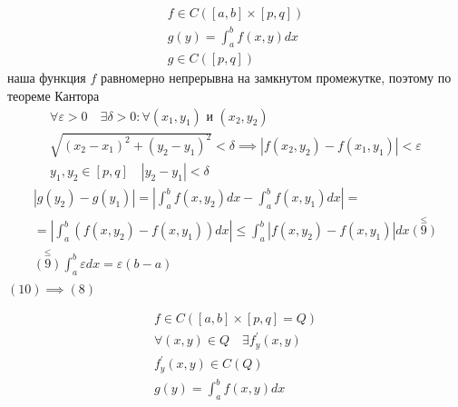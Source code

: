 \documentclass[main]{subfiles}
\begin{document}
     \begin{theorem}
          \begin{gather*}
               f \in C([a,b] \times [p,q]) \\ 
               g(y) = \int^b_a f(x,y) dx \tag{7} \\
               g \in C([p,q]) \tag{8} \end{gather*}
               наша функция $f$  равномерно непрерывна на замкнутом промежутке, поэтому по теореме Кантора 
               \begin{gather*}
               \forall \varepsilon > 0 \quad \exists \delta > 0 : \forall (x_1,y_1) \text{ и } (x_2,y_2) \\
               \sqrt{(x_2-x_1)^2 + (y_2-y_1)^2} < \delta \implies |f(x_2,y_2) - f(x_1,y_1)  | < \varepsilon \tag{9} \\
               y_1,y_2 \in [p,q] \quad |y_2 - y_1| < \delta 
          \end{gather*}
          \begin{multline*}
               |g(y_2) - g(y_1)| = \left | \int^b_a f(x,y_2) dx - \int^b_a f(x,y_1)dx \right | = \\
               = \left | \int^b_a (f(x,y_2) - f(x,y_1))dx \right | \leq \int^b_a |f(x,y_2) - f(x,y_1)|dx \stackrel{\leq}{(9)} \\
               \stackrel{\leq}{(9)} \int^b_a \varepsilon dx = \varepsilon(b-a) \tag{10} \\
                  \end{multline*}
                  $(10) \implies (8) $
     \end{theorem}
     \begin{theorem}
          \begin{gather*}
               f \in C([a,b] \times [p,q] = Q) \\
               \forall (x,y) \in Q \quad \exists f^\prime_y(x,y) \\
               f^\prime_y(x,y) \in C(Q) \tag{11} \\
               g(y) = \int^b_a f(x,y) dx \\
          \end{gather*}
     \end{theorem}
\end{document}
